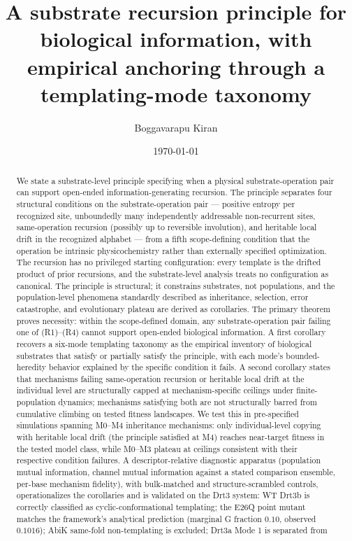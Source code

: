 \documentclass[aps,prx,reprint,amsmath,amssymb,floatfix,superscriptaddress,nofootinbib]{revtex4-2}
\theoremstyle{plain-thm}
\theoremstyle{definition-thm}
\begin{document}
\title{A substrate recursion principle for biological information, with empirical anchoring through a templating-mode taxonomy}

\author{Boggavarapu Kiran}


\date{\today}

\begin{abstract}
We state a substrate-level principle specifying when a physical substrate-operation pair can support open-ended information-generating recursion. The principle separates four structural conditions on the substrate-operation pair --- positive entropy per recognized site, unboundedly many independently addressable non-recurrent sites, same-operation recursion (possibly up to reversible involution), and heritable local drift in the recognized alphabet --- from a fifth scope-defining condition that the operation be intrinsic physicochemistry rather than externally specified optimization. The recursion has no privileged starting configuration: every template is the drifted product of prior recursions, and the substrate-level analysis treats no configuration as canonical. The principle is structural; it constrains substrates, not populations, and the population-level phenomena standardly described as inheritance, selection, error catastrophe, and evolutionary plateau are derived as corollaries. The primary theorem proves necessity: within the scope-defined domain, any substrate-operation pair failing one of (R1)--(R4) cannot support open-ended biological information. A first corollary recovers a six-mode templating taxonomy as the empirical inventory of biological substrates that satisfy or partially satisfy the principle, with each mode's bounded-heredity behavior explained by the specific condition it fails. A second corollary states that mechanisms failing same-operation recursion or heritable local drift at the individual level are structurally capped at mechanism-specific ceilings under finite-population dynamics; mechanisms satisfying both are not structurally barred from cumulative climbing on tested fitness landscapes. We test this in pre-specified simulations spanning M0--M4 inheritance mechanisms: only individual-level copying with heritable local drift (the principle satisfied at M4) reaches near-target fitness in the tested model class, while M0--M3 plateau at ceilings consistent with their respective condition failures. A descriptor-relative diagnostic apparatus (population mutual information, channel mutual information against a stated comparison ensemble, per-base mechanism fidelity), with bulk-matched and structure-scrambled controls, operationalizes the corollaries and is validated on the Drt3 system: WT Drt3b is correctly classified as cyclic-conformational templating; the E26Q point mutant matches the framework's analytical prediction (marginal G fraction $0.10$, observed $0.1016$); AbiK same-fold non-templating is excluded; Drt3a Mode 1 is separated from 
\end{abstract}
\end{document}
